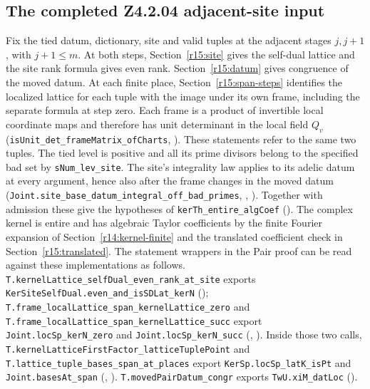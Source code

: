 \subsection{The completed Z4.2.04 adjacent-site input}\label{r15:pair}
Fix the tied datum, dictionary, site and valid tuples at the adjacent stages
$j,j+1$, with $j+1\le m$. At both steps,
Section~\ref{r15:site} gives the self-dual lattice and the site rank
formula gives even rank. Section~\ref{r15:datum} gives congruence of
the moved datum. At each finite place, Section~\ref{r15:span-steps}
identifies the localized lattice for each tuple with the image under
its own frame, including the separate formula at step zero. Each
frame is a product of invertible local coordinate maps and therefore
has unit determinant in the local field $Q_v$
(\nolinkurl{isUnit_det_frameMatrix_ofCharts},
).
These statements refer to the same two tuples.
The tied level is positive and all its prime divisors belong to the specified
bad set by \nolinkurl{sNum_lev_site}. The site's integrality law applies to
its adelic datum at every argument, hence also after the frame changes in
the moved datum (\nolinkurl{Joint.site_base_datum_integral_off_bad_primes},
,
).
Together with admission these give the hypotheses of
\nolinkurl{kerTh_entire_algCoef}
().
The complex kernel is entire and has algebraic Taylor coefficients
by the finite Fourier expansion of Section~\ref{r14:kernel-finite}
and the translated coefficient check in Section~\ref{r15:translated}.
The statement wrappers in the Pair proof can be read against these
implementations as follows. \nolinkurl{T.kernelLattice_selfDual_even_rank_at_site}
exports \nolinkurl{KerSiteSelfDual.even_and_isSDLat_kerN}
();
\nolinkurl{T.frame_localLattice_span_kernelLattice_zero} and
\nolinkurl{T.frame_localLattice_span_kernelLattice_succ} export
\nolinkurl{Joint.locSp_kerN_zero} and \nolinkurl{Joint.locSp_kerN_succ}
(,
).
Inside those two calls,
\nolinkurl{T.kernelLatticeFirstFactor_latticeTuplePoint} and
\nolinkurl{T.lattice_tuple_bases_span_at_places} export
\nolinkurl{KerSp.locSp_latK_isPt} and \nolinkurl{Joint.basesAt_span}
(,
).
\nolinkurl{T.movedPairDatum_congr} exports \nolinkurl{TwU.xiM_datLoc}
().

